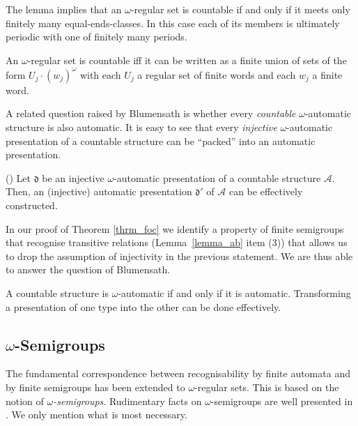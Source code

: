 \documentclass{stacs_proc}
\newcommand{\calA}{\mathcal{A}}
\newcommand{\frakd}{\mathfrak{d}}
\begin{document}
The lemma implies that an $\omega$-regular set is countable if and only if it
meets only finitely many equal-ends-classes.  In this case each of its members
is ultimately periodic with one of finitely many periods. 



\begin{corollary} \label{coroll_countable}
An $\omega$-regular set is countable iff it
can be written as a finite union of sets of the form $U_j \cdot (w_j)^\omega$ 
with each $U_j$ a regular set of finite words and each $w_j$ a finite word.
\end{corollary}



A related question raised by Blumensath \cite{Blu99} is whether every \emph{countable} 
$\omega$-automatic structure is also automatic. It is easy to see
that every \emph{injective} $\omega$-automatic presentation of a countable
structure can be ``packed'' into an automatic presentation. 


\begin{proposition}\label{prop_cnt_inj} (\cite[Theorem 5.32]{Blu99})
Let $\frakd$ be an injective $\omega$-automatic presentation of 
a countable structure $\calA$.
Then, an (injective) automatic presentation $\frakd'$ of $\calA$ 
can be effectively constructed.
\end{proposition}





In our proof of Theorem \ref{thrm_foc} we identify a property of finite
semigroups that recognise transitive relations (Lemma~\ref{lemma_ab} item (3))
that allows us to drop the assumption of injectivity in the previous statement.
We are thus able to answer the question of Blumensath.

\begin{corollary}\label{coroll_cnt}
A countable structure is $\omega$-automatic if and only if it is automatic.
Transforming a presentation of one type into the other can be done effectively.
\end{corollary}



\vskip-0.3cm
\subsection{$\omega$-Semigroups}

The fundamental correspondence between recognisability by
finite automata and by finite semigroups has been extended to 
$\omega$-regular sets. 
This is based on the notion of \emph{$\omega$-semigroups}.
Rudimentary facts on $\omega$-semigroups are well presented in \cite{PP95}.
We only mention what is most necessary.
\end{document}
